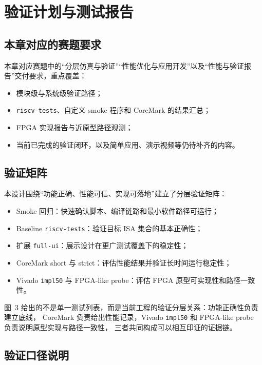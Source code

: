 \section{验证计划与测试报告}

\subsection{本章对应的赛题要求}

本章对应赛题中的“分层仿真与验证”“性能优化与应用开发”以及“性能与验证报告”交付要求，重点覆盖：
\begin{itemize}
    \item 模块级与系统级验证路径；
    \item \texttt{riscv-tests}、自定义 smoke 程序和 CoreMark 的结果汇总；
    \item FPGA 实现报告与近原型路径观测；
    \item 当前已完成的验证闭环，以及简单应用、演示视频等仍待补齐的内容。
\end{itemize}

\subsection{验证矩阵}

本设计围绕“功能正确、性能可信、实现可落地”建立了分层验证矩阵：
\begin{itemize}
    \item Smoke 回归：快速确认脚本、编译链路和最小软件路径可运行；
    \item Baseline \texttt{riscv-tests}：验证目标 ISA 集合的基本正确性；
    \item 扩展 \texttt{full-ui}：展示设计在更广测试覆盖下的稳定性；
    \item CoreMark short 与 strict：评估性能结果并验证长时间运行稳定性；
    \item Vivado \texttt{impl50} 与 FPGA-like probe：评估 FPGA 原型可实现性和路径一致性。
\end{itemize}



图~3 给出的不是单一测试列表，而是当前工程的验证分层关系：功能正确性负责建立底线，
CoreMark 负责给出性能记录，Vivado \texttt{impl50} 和 FPGA-like probe 负责说明原型实现与路径一致性，
三者共同构成可以相互印证的证据链。

\subsection{验证口径说明}

